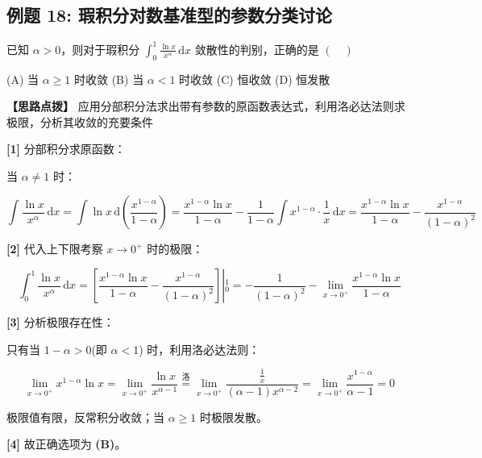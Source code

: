 \documentclass[11pt,a4paper,UTF8]{ctexart}
\begin{document}
\subsection{例题 18: 瑕积分对数基准型的参数分类讨论}

已知 $\alpha > 0$，则对于瑕积分 $\int_0^1 \frac{\ln x}{x^\alpha}\,\mathrm{d}x$ 敛散性的判别，正确的是 $(\quad)$

(A) 当 $\alpha \geqslant 1$ 时收敛 \qquad (B) 当 $\alpha < 1$ 时收敛 \qquad (C) 恒收敛 \qquad (D) 恒发散

\textbf{\color{DeepPurple}【思路点拨】} 应用分部积分法求出带有参数的原函数表达式，利用洛必达法则求极限，分析其收敛的充要条件


\begin{solbox}[分步推导与答题规范]
\textbf{[1]} 分部积分求原函数：

当 $\alpha \neq 1$ 时：


\begin{equation*}
\int \frac{\ln x}{x^\alpha}\,\mathrm{d}x = \int \ln x\,\mathrm{d}\left( \frac{x^{1-\alpha}}{1-\alpha} \right) = \frac{x^{1-\alpha}\ln x}{1-\alpha} - \frac{1}{1-\alpha}\int x^{1-\alpha} \cdot \frac{1}{x}\,\mathrm{d}x = \frac{x^{1-\alpha}\ln x}{1-\alpha} - \frac{x^{1-\alpha}}{(1-\alpha)^2}
\end{equation*}


\textbf{[2]} 代入上下限考察 $x \to 0^+$ 时的极限：


\begin{equation*}
\int_0^1 \frac{\ln x}{x^\alpha}\,\mathrm{d}x = \left. \left[ \frac{x^{1-\alpha}\ln x}{1-\alpha} - \frac{x^{1-\alpha}}{(1-\alpha)^2} \right] \right\vert{}_0^1 = -\frac{1}{(1-\alpha)^2} - \lim_{x \to 0^+} \frac{x^{1-\alpha}\ln x}{1-\alpha}
\end{equation*}


\textbf{[3]} 分析极限存在性：

只有当 $1 - \alpha > 0$(即 $\alpha < 1$) 时，利用洛必达法则：


\begin{equation*}
\lim_{x \to 0^+} x^{1-\alpha}\ln x = \lim_{x \to 0^+} \frac{\ln x}{x^{\alpha-1}} \stackrel{\text{洛}}{=} \lim_{x \to 0^+} \frac{\frac{1}{x}}{(\alpha-1)x^{\alpha-2}} = \lim_{x \to 0^+} \frac{x^{1-\alpha}}{\alpha-1} = 0
\end{equation*}


极限值有限，反常积分收敛；当 $\alpha \geqslant 1$ 时极限发散。

\textbf{[4]} 故正确选项为 \textbf{(B)}。
\end{solbox}
\end{document}
